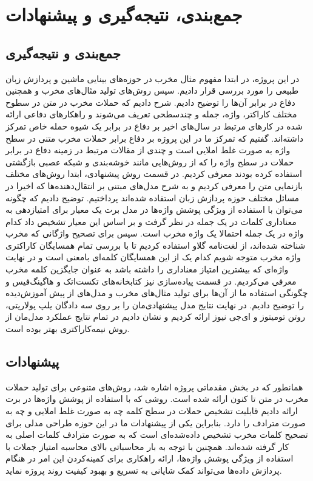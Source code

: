 \chapter{جمع‌بندی، نتیجه‌گیری و پیشنهادات}
\section{جمع‌بندی و نتیجه‌گیری}
در این پروژه، در ابتدا مفهوم مثال مخرب در حوزه‌های بینایی ماشین و پردازش زبان طبیعی را مورد بررسی قرار دادیم. سپس روش‌های تولید مثال‌های مخرب و همچنین دفاع در برابر آن‌ها را توضیح دادیم. شرح دادیم که حملات مخرب در متن در سطوح مختلف کاراکتر، واژه، جمله و چندسطحی تعریف می‌شوند و راهکارهای دفاعی ارائه ‌شده در کارهای مرتبط در سال‌های اخیر بر دفاع در برابر یک شیوه حمله خاص تمرکز داشته‌اند. گفتیم که تمرکز ما در این پروژه بر دفاع برابر حملات مخرب متنی در سطح واژه به صورت غلط املایی است و چندی از مقالات مرتبط در زمینه دفاع در برابر حملات در سطح واژه را که از روش‌هایی مانند خوشه‌بندی و شبکه‌ عصبی بازگشتی استفاده کرده بودند معرفی کردیم. در قسمت روش پیشنهادی، ابتدا روش‌های مختلف بازنمایی متن را معرفی کردیم و به شرح مدل‌های مبتنی بر انتقال‌دهنده‌ها که اخیرا در مسائل مختلف حوزه پردازش زبان استفاده شده‌اند پرداختیم. توضیح دادیم که چگونه می‌توان با استفاده از ویژگی پوشش واژ‌ه‌ها در مدل برت یک معیار برای امتیازدهی به معناداری کلمات در یک جمله در نظر گرفت و بر اساس این معیار تشخیص داد کدام واژه در یک جمله احتمالا یک واژه مخرب است. سپس برای تصحیح واژگانی که مخرب شناخته‌ شده‌اند، از لغت‌نامه گلاو استفاده کردیم تا با بررسی تمام همسایگان کاراکتری واژه مخرب متوجه شویم کدام یک از این همسایگان کلمه‌ای بامعنی است و در نهایت واژه‌ای که بیشترین امتیاز معناداری را داشته باشد به عنوان جایگزین کلمه مخرب معرفی می‌کردیم. در قسمت پیاده‌سازی نیز کتابخانه‌های تکست‌اتک و هاگینگ‌فیس و چگونگی استفاده ما از آن‌ها برای تولید مثال‌های مخرب و مدل‌های از پیش‌ آموزش‌دیده را توضیح دادیم. در نهایت نتایج مدل پیشنهادی‌مان را بر روی سه دادگان یلپ پولاریتی، روتن تومیتوز و ای‌جی نیوز ارائه کردیم و نشان دادیم در تمام نتایج عملکرد مدل‌مان از روش نیمه‌کاراکتری بهتر بوده است.

\section{پیشنهادات}
همانطور که در بخش مقدماتی پروژه اشاره شد، روش‌های متنوعی برای تولید حملات مخرب در متن تا کنون ارائه شده است. روشی که با استفاده از پوشش واژه‌ها در برت ارائه دادیم قابلیت تشخیص حملات در سطح کلمه چه به صورت غلط املایی و چه به صورت مترادف را دارد. بنابراین یکی از پیشنهادات ما در این حوزه طراحی مدلی برای تصحیح کلمات مخرب تشخیص‌ داده‌شده‌ای است که به صورت مترادف کلمات اصلی به کار گرفته شده‌اند. همچنین با توجه به بار محاسباتی بالای محاسبه امتیاز جملات با استفاده از ویژگی پوشش واژه‌ها، ارائه راهکاری برای کمینه‌کردن این امر در هنگام پردازش داده‌ها می‌تواند کمک شایانی به تسریع و بهبود کیفیت روند پروژه نماید.